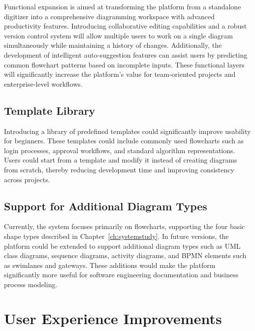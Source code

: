 Functional expansion is aimed at transforming the platform from 
a standalone digitizer into a comprehensive diagramming workspace 
with advanced productivity features. Introducing collaborative 
editing capabilities and a robust version control system will 
allow multiple users to work on a single diagram simultaneously 
while maintaining a history of changes. Additionally, the 
development of intelligent auto-suggestion features can assist 
users by predicting common flowchart patterns based on incomplete 
inputs. These functional layers will significantly increase the 
platform's value for team-oriented projects and enterprise-level 
workflows.

\subsection{Template Library}
\label{subsec:template-library}

Introducing a library of predefined templates could 
significantly improve usability for beginners. These templates 
could include commonly used flowcharts such as login processes, 
approval workflows, and standard algorithm representations. 
Users could start from a template and modify it instead of 
creating diagrams from scratch, thereby reducing development 
time and improving consistency across 
projects.~\cite{reactflow}

\subsection{Support for Additional Diagram Types}
\label{subsec:additional-diagrams}

Currently, the system focuses primarily on flowcharts, 
supporting the four basic shape types described in 
Chapter~\ref{ch:systemstudy}. In future versions, the platform 
could be extended to support additional diagram types such as 
UML class diagrams, sequence diagrams, activity diagrams, and 
BPMN elements such as swimlanes and gateways. These additions 
would make the platform significantly more useful for software 
engineering documentation and business process 
modeling.~\cite{flowchart-analysis}

\section{User Experience Improvements}
\label{sec:ux-improvements}

